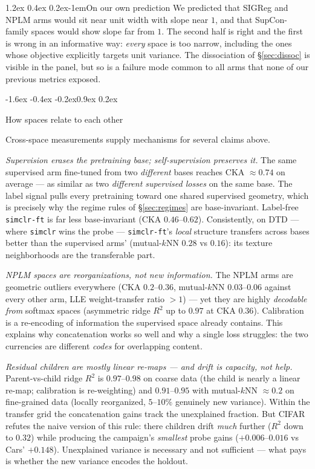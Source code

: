 \documentclass{article}
\makeatletter
\renewcommand\subsection{\@startsection{subsection}{2}{\z@}%
  {-1.6ex \@plus -0.4ex \@minus -0.2ex}{0.9ex \@plus 0.2ex}%
  {\normalsize\bf\raggedright}}
\renewcommand\paragraph{\@startsection{paragraph}{4}{\z@}%
  {1.2ex \@plus 0.4ex \@minus 0.2ex}{-1em}{\normalsize\bf}}
\makeatother
\begin{document}
\paragraph{On our own prediction}
We predicted that SIGReg and NPLM arms would sit near unit width with slope near
$1$, and that SupCon-family spaces would show slope far from $1$. The second
half is right and the first is wrong in an informative way: \emph{every} space
is too narrow, including the ones whose objective explicitly targets unit
variance. The dissociation of \S\ref{sec:dissoc} is visible in the panel, but so
is a failure mode common to all arms that none of our previous metrics exposed.

\subsection{How spaces relate to each other}

Cross-space measurements supply mechanisms for several claims above.

\emph{Supervision erases the pretraining base; self-supervision preserves it.}
The same supervised arm fine-tuned from two \emph{different} bases reaches
CKA $\approx0.74$ on average --- as similar as two \emph{different supervised
losses} on the same base. The label signal pulls every pretraining toward one
shared supervised geometry, which is precisely why the regime rules of
\S\ref{sec:regimes} are base-invariant. Label-free \texttt{simclr-ft} is far
less base-invariant (CKA $0.46$--$0.62$). Consistently, on DTD --- where
\texttt{simclr} wins the probe --- \texttt{simclr-ft}'s \emph{local} structure
transfers across bases better than the supervised arms' (mutual-$k$NN $0.28$ vs
$0.16$): its texture neighborhoods are the transferable part.

\emph{NPLM spaces are reorganizations, not new information.} The NPLM arms are
geometric outliers everywhere (CKA $0.2$--$0.36$, mutual-$k$NN $0.03$--$0.06$
against every other arm, LLE weight-transfer ratio $>1$) --- yet they are
highly \emph{decodable from} softmax spaces (asymmetric ridge $R^2$ up to
$0.97$ at CKA $0.36$). Calibration is a re-encoding of information the
supervised space already contains. This explains why concatenation works so
well and why a single loss struggles: the two currencies are different
\emph{codes} for overlapping content.

\emph{Residual children are mostly linear re-maps --- and drift is capacity,
not help.} Parent-vs-child ridge $R^2$ is $0.97$--$0.98$ on coarse data
(the child is nearly a linear re-map; calibration is re-weighting) and
$0.91$--$0.95$ with mutual-$k$NN $\approx0.2$ on fine-grained data (locally
reorganized, $5$--$10\%$ genuinely new variance). Within the transfer grid the
concatenation gains track the unexplained fraction. But CIFAR refutes the naive
version of this rule: there children drift \emph{much} further ($R^2$ down to
$0.32$) while producing the campaign's \emph{smallest} probe gains
($+0.006$--$0.016$ vs Cars' $+0.148$). Unexplained variance is necessary and not
sufficient --- what pays is whether the new variance encodes the holdout.
\end{document}
